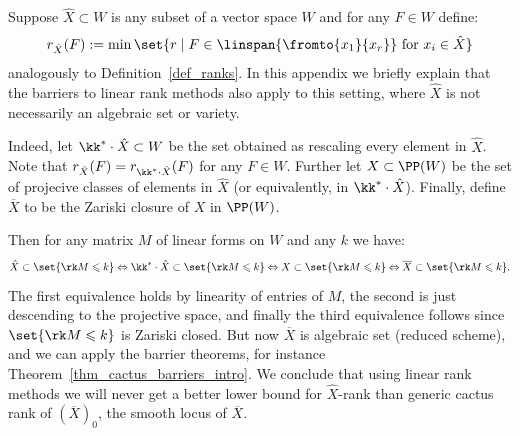 \documentclass[12pt,a4paper]{article}
\begin{document}
Suppose $\hat X \subset W$ is any subset of a vector space $W$ and for any $F\in W$ define:
\[
  r_{\hat X}(F):= \min \set{r \mid F \in \linspan{\fromto{x_1}{x_r}} \text{ for } x_i \in \hat{X}}
\]
analogously to Definition~\ref{def_ranks}.
In this appendix we briefly explain that the barriers to linear rank methods also apply to this setting, where $\hat X$ is not necessarily an algebraic set or variety.

Indeed, let $\kk^*\cdot \hat X\subset W$ be the set obtained as rescaling every element in $\hat{X}$.
Note that $r_{\hat X}(F)= r_{\kk^* \cdot \hat X}(F)$ for any $F\in W$.
Further let $X\subset \PP (W)$ be the set of projecive classes of elements in $\hat{X}$ (or equivalently, in $\kk^*\cdot \hat{X}$).
Finally, define $\overline{X}$ to be the Zariski closure of $X$ in $\PP(W)$.

Then for any matrix $M$ of linear forms on $W$ and any $k$ we have:
\[
   \hat{X}\subset \set{\rk M \leqslant k}
   \Leftrightarrow
   \kk^*\cdot \hat{X} \subset \set{\rk M \leqslant k}
   \Leftrightarrow
   X \subset \set{\rk M \leqslant k}
   \Leftrightarrow
   \overline{X} \subset \set{\rk M \leqslant k}.
\]
The first equivalence holds by linearity of entries of $M$,
the second is just descending to the projective space, and finally the third equivalence follows since $\set{\rk M \leqslant k}$ is Zariski closed.
But now $\overline{X}$ is algebraic set (reduced scheme), and we can apply the barrier theorems, for instance Theorem~\ref{thm_cactus_barriers_intro}. We conclude that using linear rank methods we will never get a better lower bound for $\hat{X}$-rank than generic cactus rank of $(\overline{X})_0$, the smooth locus of $\overline{X}$.





% 

% 
\end{document}
